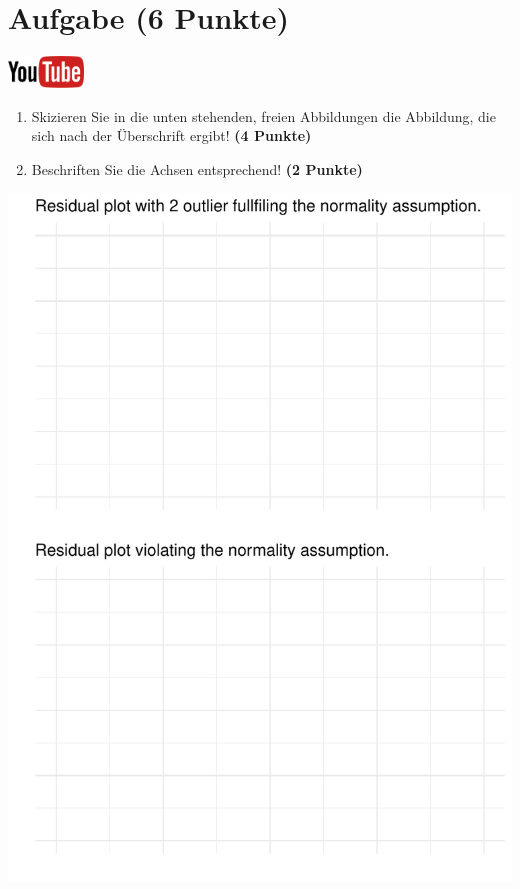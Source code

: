 \documentclass[a4paper, 9pt]{scrartcl}\usepackage[]{graphicx}\usepackage[]{xcolor}
\makeatletter
\def\maxwidth{ %
  \ifdim\Gin@nat@width>\linewidth
    \linewidth
  \else
    \Gin@nat@width
  \fi
}
\makeatother
\begin{document}
\section{Aufgabe \hfill (6 Punkte)}

\hfill\href{https://youtu.be/EK7JEtdZbnw}{\includegraphics[width =
  2cm]{img/youtube}}\\[1Ex]




\begin{enumerate}
\item Skizieren Sie in die unten stehenden, freien Abbildungen die
  Abbildung, die sich nach der {\"U}berschrift ergibt! \textbf{(4 Punkte)}
\item Beschriften Sie die Achsen entsprechend! \textbf{(2 Punkte)}
\end{enumerate}



{\centering \includegraphics[width=\maxwidth]{img/regression-03-1} 

}
\end{document}
